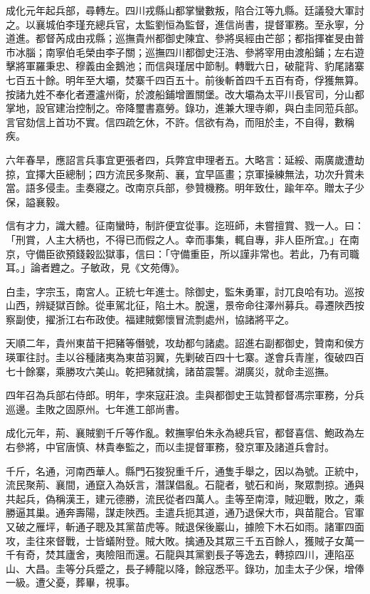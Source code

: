 \begin{pinyinscope}
成化元年起兵部，尋轉左。四川戎縣山都掌蠻數叛，陷合江等九縣。廷議發大軍討之。以襄城伯李瑾充總兵官，太監劉恒為監督，進信尚書，提督軍務。至永寧，分道進。都督芮成由戎縣；巡撫貴州都御史陳宜、參將吳經由芒部；都指揮崔旻由普市冰腦；南寧伯毛榮由李子關；巡撫四川都御史汪浩、參將宰用由渡船鋪；左右遊擊將軍羅秉忠、穆義由金鵝池；而信與瑾居中節制。轉戰六日，破龍背、豹尾諸寨七百五十餘。明年至大壩，焚寨千四百五十。前後斬首四千五百有奇，俘獲無算。按諸九姓不奉化者遷瀘州衛，於渡船鋪增置關堡。改大壩為太平川長官司，分山都掌地，設官建治控制之。帝降璽書嘉勞。錄功，進兼大理寺卿，與白圭同蒞兵部。言官劾信上首功不實。信四疏乞休，不許。信欲有為，而阻於圭，不自得，數稱疾。

六年春旱，應詔言兵事宜更張者四，兵弊宜申理者五。大略言：延綏、兩廣歲遭劫掠，宜擇大臣總制；四方流民多聚荊、襄，宜早區畫；京軍操練無法，功次升賞未當。語多侵圭。圭奏寢之。改南京兵部，參贊機務。明年致仕，踰年卒。贈太子少保，謚襄毅。

信有才力，識大體。征南蠻時，制許便宜從事。迄班師，未嘗擅賞、戮一人。曰：「刑賞，人主大柄也，不得已而假之人。幸而事集，輒自專，非人臣所宜。」在南京，守備臣欲預錢穀訟獄事，信曰：「守備重臣，所以謹非常也。若此，乃有司職耳。」論者韙之。子敏政，見《文苑傳》。

白圭，字宗玉，南宮人。正統七年進士。除御史，監朱勇軍，討兀良哈有功。巡按山西，辨疑獄百餘。從車駕北征，陷土木。脫還，景帝命往澤州募兵。尋遷陜西按察副使，擢浙江右布政使。福建賊鄭懷冒流剽處州，協諸將平之。

天順二年，貴州東苗干把豬等僭號，攻劫都勻諸處。詔進右副都御史，贊南和侯方瑛軍往討。圭以谷種諸夷為東苗羽翼，先剿破百四十七寨。遂會兵青崖，復破四百七十餘寨，乘勝攻六美山。乾把豬就擒，諸苗震讋。湖廣災，就命圭巡撫。

四年召為兵部右侍郎。明年，孛來寇莊浪。圭與都御史王竑贊都督馮宗軍務，分兵巡邊。圭敗之固原州。七年進工部尚書。

成化元年，荊、襄賊劉千斤等作亂。敕撫寧伯朱永為總兵官，都督喜信、鮑政為左右參將，中官唐慎、林貴奉監之，而以圭提督軍務，發京軍及諸道兵會討。

千斤，名通，河南西華人。縣門石狻猊重千斤，通隻手舉之，因以為號。正統中，流民聚荊、襄間，通竄入為妖言，潛謀倡亂。石龍者，號石和尚，聚眾剽掠。通與共起兵，偽稱漢王，建元德勝，流民從者四萬人。圭等至南漳，賊迎戰，敗之，乘勝逼其巢。通奔壽陽，謀走陜西。圭遣兵扼其道，通乃退保大市，與苗龍合。官軍又破之雁坪，斬通子聰及其黨苗虎等。賊退保後巖山，據險下木石如雨。諸軍四面攻，圭往來督戰，士皆蟻附登。賊大敗。擒通及其眾三千五百餘人，獲賊子女萬一千有奇，焚其廬舍，夷險阻而還。石龍與其黨劉長子等逸去，轉掠四川，連陷巫山、大昌。圭等分兵蹙之，長子縛龍以降，餘寇悉平。錄功，加圭太子少保，增俸一級。遭父憂，葬畢，視事。


\end{pinyinscope}
